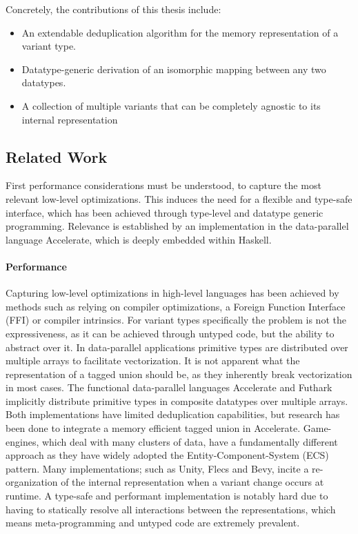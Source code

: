 \documentclass{article}
\begin{document}
\noindent
Concretely, the contributions of this thesis include: 

\begin{itemize}
    \item An extendable deduplication algorithm for the memory representation of a variant type.
    \item Datatype-generic derivation of an isomorphic mapping between any two datatypes.
    \item A collection of multiple variants that can be completely agnostic to its internal representation
\end{itemize}

\newpage

\subsection{Related Work}

First performance considerations must be understood, to capture the most relevant low-level optimizations.
This induces the need for a flexible and type-safe interface, which has been achieved through type-level and datatype generic programming.
Relevance is established by an implementation in the data-parallel language Accelerate, which is deeply embedded within Haskell.

\paragraph{Performance}

Capturing low-level optimizations in high-level languages has been achieved by methods such as relying on compiler optimizations, a Foreign Function Interface (FFI) or compiler intrinsics. 
For variant types specifically the problem is not the expressiveness, as it can be achieved through untyped code, but the ability to abstract over it.   
In data-parallel applications primitive types are distributed over multiple arrays to facilitate vectorization.
It is not apparent what the representation of a tagged union should be, as they inherently break vectorization in most cases. 
The functional data-parallel languages Accelerate\cite{accelerate-sum-types} and Futhark\cite{futhark-sum-types} implicitly distribute primitive types in composite datatypes over multiple arrays.
Both implementations have limited deduplication capabilities, but research has been done to integrate a memory efficient tagged union in Accelerate\cite{accelerate-sum-types}.
Game-engines, which deal with many clusters of data, have a fundamentally different approach as they have widely adopted the Entity-Component-System (ECS) pattern. 
Many implementations; such as Unity\cite{unity-ecs-patent}, Flecs\cite{ecs-flecs} and Bevy\cite{ecs-bevy}, incite a re-organization of the internal representation when a variant change occurs at runtime.
A type-safe and performant implementation is notably hard due to having to statically resolve all interactions between the representations, which means meta-programming and untyped code are extremely prevalent. 
\end{document}
